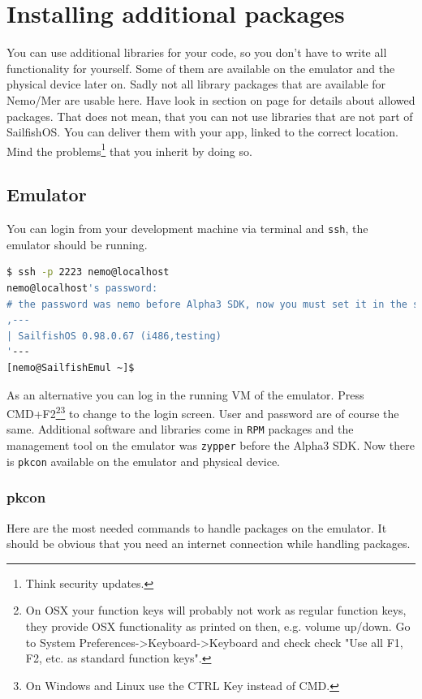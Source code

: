 %
\section{Installing additional packages}\label{sec:addpkg}
%
You can use additional libraries for your code, so you don't have to write all functionality for yourself. Some of them are available on the emulator and the physical device later on. Sadly not all library packages that are available for Nemo/Mer are usable here. Have look in section  on page \pageref{sec:harbour} for details about allowed packages. That does not mean, that you can not use libraries that are not part of SailfishOS. You can deliver them with your app, linked to the correct location. Mind the problems\footnote{Think security updates.} that you inherit by doing so.
%
%
\subsection{Emulator}\label{subsec:pkgemulator}
%
You can login from your development machine via terminal and \verb,ssh,, the emulator should be running.
\begin{lstlisting}[language=bash]
$ ssh -p 2223 nemo@localhost
nemo@localhost's password:
# the password was nemo before Alpha3 SDK, now you must set it in the settings app inside the emulator!
,---
| SailfishOS 0.98.0.67 (i486,testing)
'---
[nemo@SailfishEmul ~]$
\end{lstlisting}
%
As an alternative you can log in the running VM of the emulator. Press CMD+F2\footnote{On OSX your function keys will probably not work as regular function keys, they provide OSX functionality as printed on then, e.g. volume up/down. Go to System Preferences->Keyboard->Keyboard and check check "Use all F1, F2, etc. as standard function keys".}\footnote{On Windows and Linux use the CTRL Key instead of CMD.} to change to the login screen. User and password are of course the same.
%
Additional software and libraries come in \verb,RPM, packages and the management tool on the emulator was \verb,zypper, before the Alpha3 SDK. Now there is \verb,pkcon,\cite{pkcon01} available on the emulator and physical device.
%
%
\subsubsection{pkcon}\label{subsubsec:pkcon}
%
Here are the most needed commands to handle packages on the emulator. It should be obvious that you need an internet connection while handling packages.

